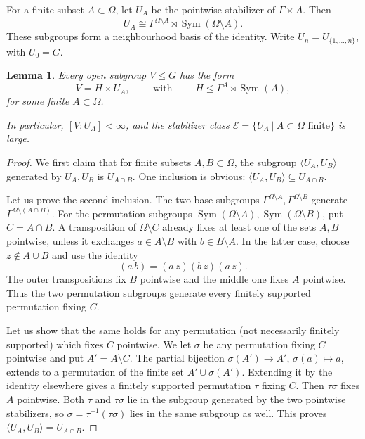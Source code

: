 \documentclass[11pt,a4paper]{amsart}
\theoremstyle{plain}%
\newtheorem{lemma}{Lemma}[subsection]
\theoremstyle{definition}
\theoremstyle{remark}
\begin{document}
For a finite subset $A\subset\Omega$, let $U_A$ be the pointwise stabilizer
of $\Gamma\times A$. Then
\[
  U_A\cong\Gamma^{\Omega\setminus A}\rtimes
       \operatorname{Sym}(\Omega\setminus A).
\]
These subgroups form a neighbourhood basis of the identity. Write
$U_n=U_{\{1,\ldots,n\}}$, with $U_0=G$.

\begin{lemma}\label{lem:wp-open-subgroups}
Every open subgroup $V\leq G$ has the form
\[
  V=H\times U_A,
  \qquad \text{ with } \qquad H\leq\Gamma^A\rtimes\operatorname{Sym}(A),
\]
for some finite $A\subset\Omega$. 

In particular, $[V:U_A]<\infty$,
and the stabilizer class
$\mathcal E=\{U_A \ | \ A\subset\Omega\text{ finite}\}$ is large.
\end{lemma}

\begin{proof}
We first claim that for finite subsets $A,B\subset\Omega$, the subgroup $\langle U_A,U_B\rangle$ generated by $U_A, U_B$ is $U_{A\cap B}$. One inclusion is obvious: $\langle U_A,U_B\rangle\subseteq U_{A\cap B}$.

Let us prove the second inclusion. The two base subgroups $\Gamma^{\Omega\setminus A}, \Gamma^{\Omega\setminus B}$ generate
$\Gamma^{\Omega\setminus(A\cap B)}$. For the permutation subgroups $\operatorname{Sym}(\Omega\setminus A), \operatorname{Sym}(\Omega\setminus B)$,
put $C=A\cap B$. A transposition of $\Omega\setminus C$ already
fixes at least one of the sets $A, B$ pointwise, unless it exchanges
$a\in A\setminus B$ with $b\in B\setminus A$. 
In the latter case,
choose $z\notin A\cup B$ and use the identity
\[
  (a\,b)=(a\,z)(b\,z)(a\,z).
\]
The outer transpositions fix $B$ pointwise and the middle one
fixes $A$ pointwise. Thus the two permutation subgroups generate
every finitely supported permutation fixing $C$.

Let us show that the same holds for any permutation (not necessarily finitely supported) which fixes $C$ pointwise. We let $\sigma$ be any permutation fixing $C$ pointwise and put
$A'=A\setminus C$. The partial bijection
$\sigma(A')\to A'$, $\sigma(a)\mapsto a$, extends to a permutation
of the finite set $A'\cup\sigma(A')$. Extending it by the identity elsewhere
gives a finitely supported permutation $\tau$ fixing $C$.
Then $\tau\sigma$ fixes $A$ pointwise. Both $\tau$ and
$\tau\sigma$ lie in the subgroup generated by the two pointwise
stabilizers, so $\sigma=\tau^{-1}(\tau\sigma)$ lies in the same subgroup as well. This proves $\langle U_A,U_B\rangle= U_{A\cap B}$.





\end{proof}
\end{document}
